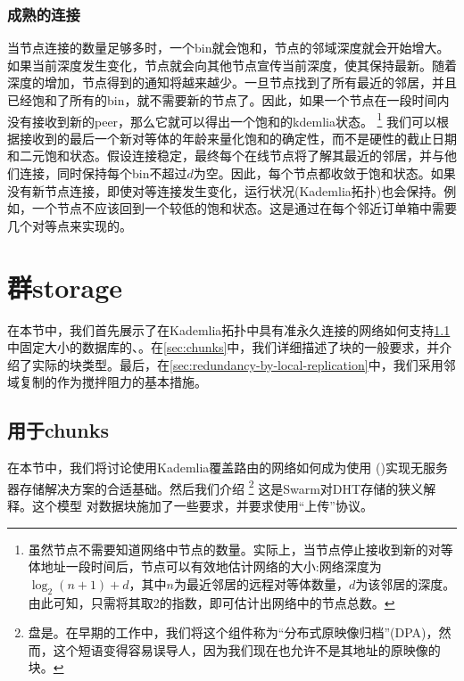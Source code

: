 \subsubsection{成熟的连接}

当节点连接的数量足够多时，一个bin就会饱和，节点的邻域深度就会开始增大。如果当前深度发生变化，节点就会向其他节点宣传当前深度，使其保持最新。随着深度的增加，节点得到的通知将越来越少。一旦节点找到了所有最近的邻居，并且已经饱和了所有的bin，就不需要新的节点了。因此，如果一个节点在一段时间内没有接收到新的peer，那么它就可以得出一个饱和的kdemlia状态。%
%
\footnote{虽然节点不需要知道网络中节点的数量。实际上，当节点停止接收到新的对等体地址一段时间后，节点可以有效地估计网络的大小:网络深度为$\log_2(n+1)+ d$，其中$n$为最近邻居的远程对等体数量，$d$为该邻居的深度。由此可知，只需将其取2的指数，即可估计出网络中的节点总数。}
%
我们可以根据接收到的最后一个新对等体的年龄来量化饱和的确定性，而不是硬性的截止日期和二元饱和状态。假设连接稳定，最终每个在线节点将了解其最近的邻居，并与他们连接，同时保持每个bin不超过$d$为空。因此，每个节点都收敛于饱和状态。如果没有新节点连接，即使对等连接发生变化，运行状况(Kademlia拓扑)也会保持。例如，一个节点不应该回到一个较低的饱和状态。这是通过在每个邻近订单箱中需要几个对等点来实现的。 

\section{群storage\statusgreen}\label{sec:kademlia-storage}

在本节中，我们首先展示了在Kademlia拓扑中具有准永久连接的网络如何支持\ref{sec:disc}中固定大小的数据库的、。在\ref{sec:chunks}中，我们详细描述了块的一般要求，并介绍了实际的块类型。最后，在\ref{sec:redundancy-by-local-replication}中，我们采用邻域复制的作为搅拌阻力的基本措施。

\subsection{用于chunks}\label{sec:disc}
 
在本节中，我们将讨论使用Kademlia覆盖路由的网络如何成为使用 ()实现无服务器存储解决方案的合适基础。然后我们介绍%
%
\footnote{盘是。在早期的工作中，我们将这个组件称为“分布式原映像归档”(DPA)，然而，这个短语变得容易误导人，因为我们现在也允许不是其地址的原映像的块。}
% 
这是Swarm对DHT存储的狭义解释。这个模型 
对数据块施加了一些要求，并要求使用“上传”协议。 

